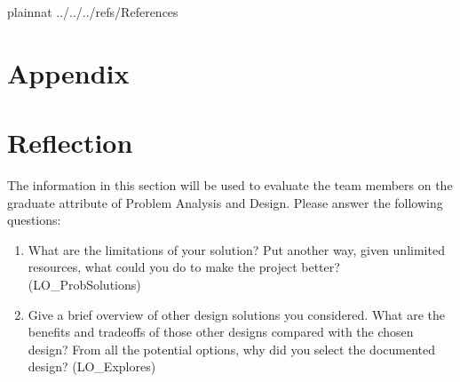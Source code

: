 \documentclass[12pt, titlepage]{article}
\begin{document}
 {plainnat}
 {../../../refs/References}

\newpage

\section{Appendix} \label{Appendix}


\section{Reflection}

The information in this section will be used to evaluate the team members on the
graduate attribute of Problem Analysis and Design.  Please answer the following questions:

\begin{enumerate}
  \item What are the limitations of your solution?  Put another way, given
  unlimited resources, what could you do to make the project better? (LO\_ProbSolutions)
  \item Give a brief overview of other design solutions you considered.  What
  are the benefits and tradeoffs of those other designs compared with the chosen
  design?  From all the potential options, why did you select the documented design?
  (LO\_Explores)
\end{enumerate}
\end{document}
